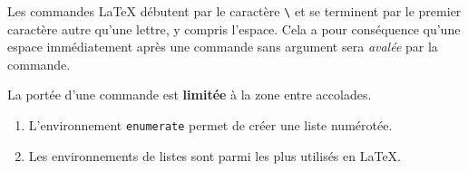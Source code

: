 \documentclass[12pt,french]{article}
\begin{document}
Les commandes {\LaTeX} débutent par le caractère \verb=\= et se
terminent par le premier caractère autre qu'une lettre, y compris
l'espace. Cela a pour conséquence qu'une espace immédiatement après
une commande sans argument sera \emph{avalée} par la commande.

La portée d'une commande est {\bfseries limitée} à la zone entre accolades.

\begin{enumerate}
\item L'environnement \texttt{enumerate} permet de créer une liste
  numérotée.
\item Les environnements de listes sont parmi les plus utilisés en
  \LaTeX.
\end{enumerate}
\end{document}

